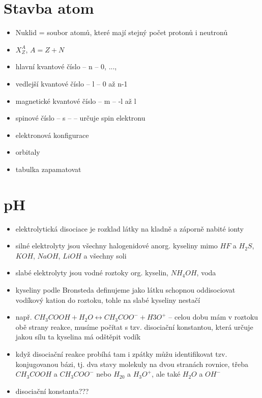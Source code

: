 \documentclass{article}
\begin{document}
\section{Stavba atom}
\begin{itemize}
    \item Nuklid = soubor atomů, které mají stejný počet protonů i neutronů
    \item $X_Z^A$, $A=Z+N$
\end{itemize}
\begin{itemize}
    \item hlavní kvantové číslo -- n -- 0, ..., \infty
    \item vedlejší kvantové číslo -- l -- 0 až n-1
    \item magnetické kvantové číslo -- m -- -l až l
    \item spinové číslo -- s -- \pm {} -- určuje spin elektronu
\end{itemize}
\begin{itemize}
\item elektronová konfigurace
\item orbitaly
\item tabulka zapamatovat
\end{itemize}

\section{pH}
\begin{itemize}
    \item elektrolytická disociace je rozklad látky na kladně a záporně nabité ionty
    \item silné elektrolyty jsou všechny halogenidové anorg. kyseliny mimo $HF$ a $H_2S$, $KOH$, $NaOH$, $LiOH$ a všechny soli
    \item slabé elektrolyty jsou vodné roztoky org. kyselin, $NH_4OH$, voda
    \item kyseliny podle Bronsteda definujeme jako látku schopnou oddisociovat vodíkový kation do roztoku, tohle na slabé kyseliny nestačí
    \item např. $CH_3COOH + H_2O \leftrightarrow CH_3COO^-+H3O^+$ -- celou dobu mám v roztoku obě strany reakce, musíme počítat s tzv. disociační konstantou, která určuje jakou sílu ta kyselina má odštěpit vodík
    \item když disociační reakce probíhá tam i zpátky můžu identifikovat tzv. konjugovanou bázi, tj. dva stavy  molekuly na dvou stranách rovnice, třeba $CH_3COOH$ a $CH_3COO^-$ nebo $H_20$ a $H_3O^+$, ale také $H_2O$ a $OH^-$
    \item disociační konstanta???
\end{itemize}
\end{document}

